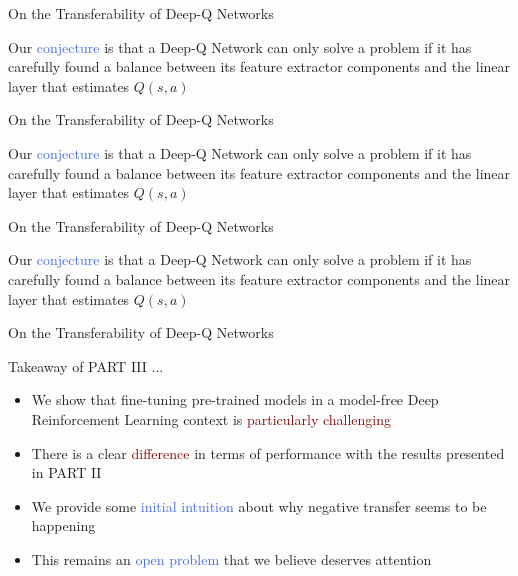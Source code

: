 \documentclass{beamer}
\begin{document}
\begin{frame}{On the Transferability of Deep-Q Networks}

	\bigskip
	Our \textcolor{RoyalBlue}{conjecture} is that a Deep-Q Network can only solve a problem if it has carefully found a balance between its feature extractor components and the linear layer that estimates $Q(s,a)$

	\bigskip

	

\end{frame}

\begin{frame}{On the Transferability of Deep-Q Networks}

	\bigskip
	Our \textcolor{RoyalBlue}{conjecture} is that a Deep-Q Network can only solve a problem if it has carefully found a balance between its feature extractor components and the linear layer that estimates $Q(s,a)$

	\bigskip

	

\end{frame}

\begin{frame}{On the Transferability of Deep-Q Networks}

	\bigskip
	Our \textcolor{RoyalBlue}{conjecture} is that a Deep-Q Network can only solve a problem if it has carefully found a balance between its feature extractor components and the linear layer that estimates $Q(s,a)$

	\bigskip

	

\end{frame}


\begin{frame}{On the Transferability of Deep-Q Networks}
	
	Takeaway of PART III ...
	\bigskip
	\begin{itemize}
		\item We show that fine-tuning pre-trained models in a model-free Deep Reinforcement Learning context is \textcolor{Maroon}{particularly challenging} 
		\item There is a clear \textcolor{Maroon}{difference} in terms of performance with the results presented in PART II
		\item We provide some \textcolor{RoyalBlue}{initial intuition} about why negative transfer seems to be happening
		\item This remains an \textcolor{RoyalBlue}{open problem} that we believe deserves attention
	\end{itemize}

\end{frame}
\end{document}
